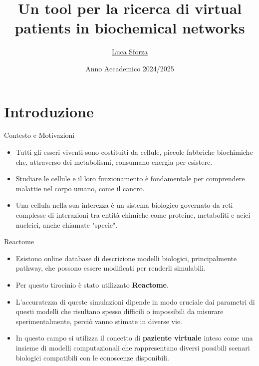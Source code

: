 \documentclass{beamer}
\title{Un tool per la ricerca di virtual patients in
biochemical networks}
\author{\href{mailto:sforza.2050030@studenti.uniroma1.it}{Luca Sforza}}
\date{Anno Accademico 2024/2025}
\begin{document}
\maketitle

\section{Introduzione}

\begin{frame}[fragile]{Contesto e Motivazioni}


\begin{itemize}
    \item Tutti gli esseri viventi sono costituiti da cellule, piccole fabbriche biochimiche che,
attraverso dei metabolismi, consumano energia per esistere. 
    \item Studiare le cellule e
il loro funzionamento è fondamentale per comprendere malattie nel corpo umano,
come il cancro.
    \item Una cellula nella sua interezza è un sistema biologico governato da reti complesse di interazioni
tra entità chimiche come proteine, metaboliti e acici nucleici, anche chiamate "specie".
\end{itemize}


\end{frame}

\begin{frame}[fragile]{Reactome}

    \begin{itemize}
        \item Esistono online database di descrizione modelli biologici, principalmente pathway, che possono essere modificati
    per renderli simulabili.
        \item Per questo tirocinio è stato utilizzato \textbf{Reactome}.
        \item L'accuratezza di queste simulazioni dipende in modo cruciale dai parametri di questi modelli
    che risultano spesso difficili o impossibili da misurare sperimentalmente, perciò vanno stimate in diverse vie.
        \item In questo campo si utilizza il concetto di \textbf{paziente virtuale} inteso come una insieme di modelli
computazionali che rappresentano diversi possibili scenari biologici compatibili con
le conoscenze disponibili.
    \end{itemize}
    
\end{frame}
\end{document}
